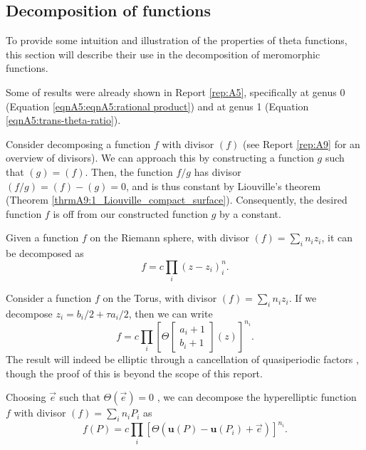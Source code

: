 \subsection{Decomposition of functions}\label{secB12:decomposition}
To provide some intuition and illustration of the properties of theta functions, this section will describe their use in the decomposition of meromorphic functions.

Some of results were already shown in Report \ref{rep:A5}, specifically at genus 0 (Equation \ref{eqnA5:eqnA5:rational product}) and at genus 1 (Equation \ref{eqnA5:trans-theta-ratio}).

Consider decomposing a function $f$ with divisor $(f)$ (see Report \ref{rep:A9} for an overview of divisors). We can approach this by constructing a function $g$ such that $(g)=(f)$. Then, the function $f/g$ has divisor $(f/g)=(f)-(g)=0$, and is thus constant by Liouville's theorem (Theorem \ref{thrmA9:1_Liouville_compact_surface}). Consequently, the desired function $f$ is off from our constructed function $g$ by a constant.

\begin{lemma}
    Given a function $f$ on the Riemann sphere, with divisor $(f)=\sum_i n_i z_i$, it can be decomposed as
    \begin{equation}
        f = c \prod_i (z-z_i)^n_i.
    \end{equation}
\end{lemma}

\begin{lemma}
    Consider a function $f$ on the Torus, with divisor $(f) = \sum_i n_i z_i$. If we decompose $z_i = b_i/2 + \tau a_i/2$, then we can write
    \begin{equation}
        f = c \prod_i \left[\Theta\begin{bmatrix}a_i+1 \\ b_i+1\end{bmatrix}(z)\right]^{n_i}.
    \end{equation}
    The result will indeed be elliptic through a cancellation of quasiperiodic factors \cite{Cha22}, though the proof of this is beyond the scope of this report.
\end{lemma}

\begin{lemma}
    Choosing $\vec e$ such that $\Theta(\vec e)=0$ \cite{Ber06}, we can decompose the hyperelliptic function $f$ with divisor $(f) = \sum_i n_i P_i$ as 
    \begin{equation}
        f(P) = c \prod_i \left[\Theta(\mathbf{u}(P) - \mathbf{u}(P_i) + \vec e)\right]^{n_i}.
    \end{equation}
\end{lemma}

